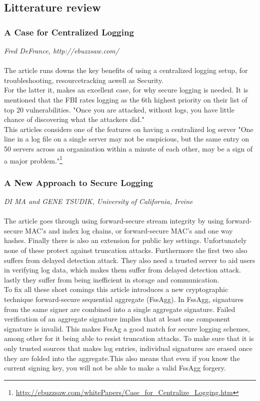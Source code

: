 
\subsection{Litterature review}

\subsubsection{A Case for Centralized Logging }
\footnotesize \textit{Fred DeFrance, http://ebuzzsaw.com/ }\\\\
\normalsize
The article runs downs the key benefits of using a centralized logging setup, for troubleshooting, resourcetracking aswell as Security. \\
For the latter it, makes an excellent case, for why secure logging is needed. It is mentioned that the FBI rates logging as the 6th highest priority on their list of top 20 vulnerabilities. "Once you are attacked, without logs, you have little chance of discovering what the attackers did."\\
This articles considers one of the features on having a centralized log server "One line in a log file on a single server may not be suspicious, but the same entry on 50 servers across an organization within a minute of each other, may be a sign of a major problem."\footnote{\url{http://ebuzzsaw.com/whitePapers/Case_for_Centralize_Logging.htm}}

\subsubsection{A New Approach to Secure Logging}
\footnotesize \textit{DI MA and GENE TSUDIK, University of California, Irvine}
\\\\ 
\normalsize The article goes through using forward-secure stream integrity by using forward-secure MAC's and index log chains, or forward-secure MAC's and one way hashes. Finally there is also an extension for public key settings. Unfortunately none of these protect against truncation attacks. Furthermore the first two also suffers from delayed detection attack. They also need a trusted server to aid users in verifying log data, which makes them suffer from delayed detection attack. lastly they suffer from being inefficient in storage and communication.\\
To fix all these short comings this article introduces a new cryptographic technique  forward-secure sequential aggregate (FssAgg). In FssAgg, signatures from the same signer are combined into a single aggregate signature. Failed verification of an aggregate signature implies that at least one component signature is invalid. This makes FssAg a good match for secure logging schemes, among other for it being able to resist truncation attacks. To make sure that it is only trusted sources that makes log entries, individual signatures are erased once they are folded into the aggregate.This also means that even if you know the current signing key, you will not be able to make a valid FssAgg forgery.\\

